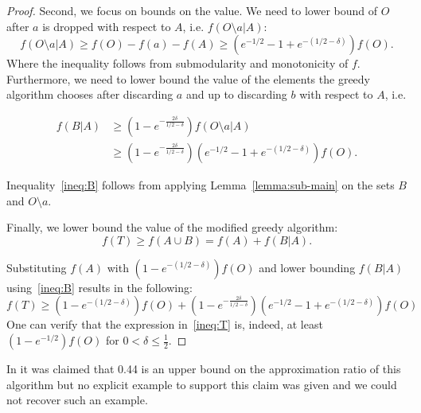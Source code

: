 \begin{proof}
	Second, we focus on bounds on the value.
	We need to lower bound of $O$ after $a$ is dropped with respect to $A$, i.e. $f(O \setminus a | A)$:
	\begin{equation}
		f(O \setminus a | A) \geq f(O) - f(a) - f(A) \geq (e^{-1/2} - 1 + e^{-(1/2 - \delta)})f(O).
	\end{equation}
	Where the inequality follows from submodularity and monotonicity of $f$.
	Furthermore, we need to lower bound the value of the elements the greedy algorithm chooses after discarding $a$ and up to discarding $b$ with respect to $A$, i.e. 
	
	\begin{align}
		\label{ineq:B}
		\nonumber
		f(B|A)	& \geq (1 - e^{-\frac{2\delta}{1/2 - \delta}})f(O \setminus a | A)
		\\ 		& \geq (1 - e^{-\frac{2\delta}{1/2 - \delta}})(e^{-1/2} - 1 + e^{-(1/2 - \delta)})f(O).
	\end{align}
	
	Inequality~\ref{ineq:B} follows from applying Lemma~\ref{lemma:sub-main} on the sets $B$ and $O \setminus a$.
	
	Finally, we lower bound the value of the modified greedy algorithm:
	\begin{equation}
		f(T) \geq f(A \cup B) = f(A) + f(B | A).
	\end{equation}
	
	Substituting $f(A)$ with $(1 - e^{-(1/2 - \delta)})f(O)$ and lower bounding $f(B|A)$ using~\ref{ineq:B} results in the following:
	\begin{equation}
		\label{ineq:T}
		f(T) \geq (1 - e^{-(1/2 - \delta)})f(O) + (1 - e^{-\frac{2\delta}{1/2 - \delta}})(e^{-1/2} - 1 + e^{-(1/2 - \delta)})f(O)
	\end{equation}
	One can verify that the expression in~\ref{ineq:T} is, indeed, at least $(1-e^{-1/2})f(O)$ for $0 < \delta \leq \frac{1}{2}$.
\end{proof}

In \cite{khuller1999budgeted} it was claimed that 0.44 is an upper bound on the approximation ratio of this algorithm but no explicit example to support this claim was given and we could not recover such an example.

